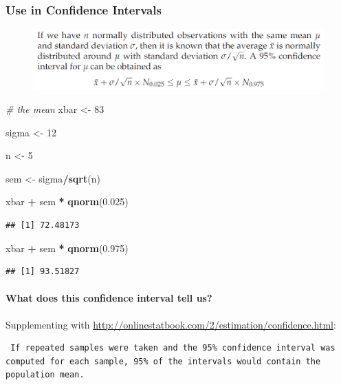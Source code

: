 \documentclass[]{article}
\newenvironment{Shaded}{\begin{snugshade}}{\end{snugshade}}
\newcommand{\KeywordTok}[1]{\textcolor[rgb]{0.13,0.29,0.53}{\textbf{#1}}}
\newcommand{\DecValTok}[1]{\textcolor[rgb]{0.00,0.00,0.81}{#1}}
\newcommand{\FloatTok}[1]{\textcolor[rgb]{0.00,0.00,0.81}{#1}}
\newcommand{\StringTok}[1]{\textcolor[rgb]{0.31,0.60,0.02}{#1}}
\newcommand{\CommentTok}[1]{\textcolor[rgb]{0.56,0.35,0.01}{\textit{#1}}}
\newcommand{\OperatorTok}[1]{\textcolor[rgb]{0.81,0.36,0.00}{\textbf{#1}}}
\newcommand{\NormalTok}[1]{#1}
\let\oldparagraph\paragraph
\renewcommand{\paragraph}[1]{\oldparagraph{#1}\mbox{}}
\begin{document}
\subsubsection{Use in Confidence
Intervals}\label{use-in-confidence-intervals}

\begin{figure}
\centering
\includegraphics{img/95ci.png}
\caption{}
\end{figure}

\begin{Shaded}
\begin{Highlighting}[]
\CommentTok{# the mean}
\NormalTok{xbar <-}\StringTok{ }\DecValTok{83}

\NormalTok{sigma <-}\StringTok{ }\DecValTok{12}

\NormalTok{n <-}\StringTok{ }\DecValTok{5}

\NormalTok{sem <-}\StringTok{ }\NormalTok{sigma}\OperatorTok{/}\KeywordTok{sqrt}\NormalTok{(n)}

\NormalTok{xbar }\OperatorTok{+}\StringTok{ }\NormalTok{sem }\OperatorTok{*}\StringTok{ }\KeywordTok{qnorm}\NormalTok{(}\FloatTok{0.025}\NormalTok{)}
\end{Highlighting}
\end{Shaded}

\begin{verbatim}
## [1] 72.48173
\end{verbatim}

\begin{Shaded}
\begin{Highlighting}[]
\NormalTok{xbar }\OperatorTok{+}\StringTok{ }\NormalTok{sem }\OperatorTok{*}\StringTok{ }\KeywordTok{qnorm}\NormalTok{(}\FloatTok{0.975}\NormalTok{)}
\end{Highlighting}
\end{Shaded}

\begin{verbatim}
## [1] 93.51827
\end{verbatim}

\paragraph{What does this confidence interval tell
us?}\label{what-does-this-confidence-interval-tell-us}

Supplementing with
\url{http://onlinestatbook.com/2/estimation/confidence.html}:

\begin{verbatim}
 If repeated samples were taken and the 95% confidence interval was computed for each sample, 95% of the intervals would contain the population mean.
\end{verbatim}
\end{document}

